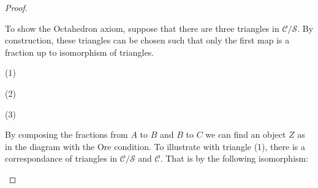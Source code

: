 \begin{proof}
\begin{center}
        \end{center}
        To show the Octahedron axiom, suppose that there are three triangles in $\mathcal{C}/\mathcal{S}$. By construction, these triangles can be chosen such that only the first map is a fraction up to isomorphism of triangles.
        \begin{center}
            (1)
            (2)
            (3)
        \end{center}
        By composing the fractions from $A$ to $B$ and $B$ to $C$ we can find an object $Z$ as in the diagram with the Ore condition. To illustrate with triangle (1), there is a correspondance of triangles in $\mathcal{C}/\mathcal{S}$ and $\mathcal{C}$. That is by the following isomorphism:
        \begin{center}
            \begin{tikzcd}

\end{tikzcd}
\end{center}
\end{proof}
